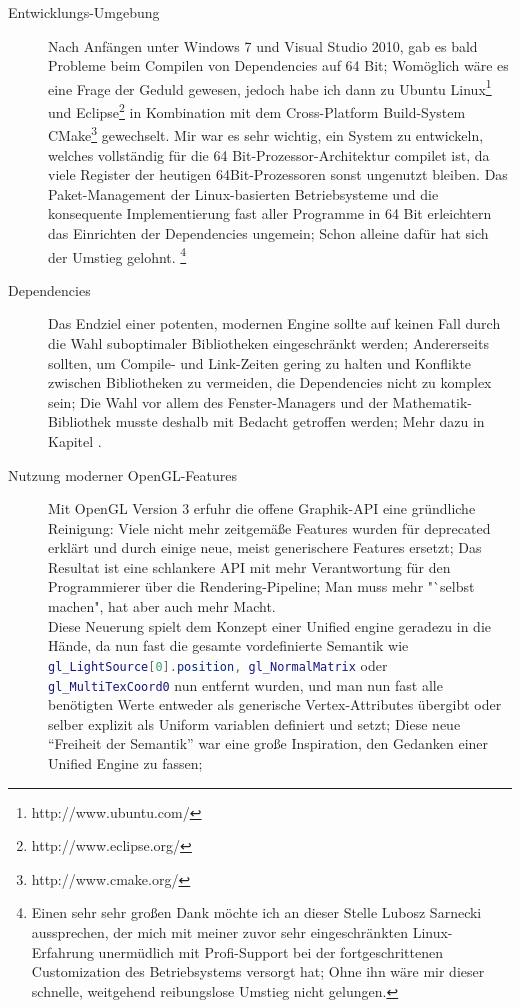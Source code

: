 \begin{description}

	\item[Entwicklungs-Umgebung]
	Nach Anfängen unter Windows 7 und Visual Studio 2010, gab es bald Probleme beim Compilen von Dependencies auf 
	64 Bit; Womöglich wäre es eine Frage der Geduld gewesen, jedoch habe ich dann zu 
	Ubuntu Linux\footnote{http://www.ubuntu.com/} und Eclipse\footnote{http://www.eclipse.org/} in 
	Kombination mit dem Cross-Platform Build-System CMake\footnote{http://www.cmake.org/} gewechselt. Mir war es sehr 	
	wichtig, ein System zu entwickeln, welches vollständig für die 64 Bit-Prozessor-Architektur compilet ist, da viele 
	Register der heutigen 64Bit-Prozessoren sonst ungenutzt bleiben.
	Das Paket-Management der Linux-basierten Betriebsysteme und die konsequente Implementierung fast aller Programme in 64 
	Bit erleichtern das Einrichten der Dependencies ungemein; Schon alleine dafür hat sich der Umstieg 
	gelohnt.
	\footnote{Einen sehr sehr großen Dank möchte ich an dieser Stelle Lubosz Sarnecki aussprechen, der mich mit 
	meiner zuvor sehr eingeschränkten Linux-Erfahrung unermüdlich mit Profi-Support bei der fortgeschrittenen Customization 
	des Betriebsystems versorgt hat; Ohne ihn wäre mir dieser schnelle, weitgehend reibungslose Umstieg nicht gelungen.}

	\item[Dependencies]
	Das Endziel einer potenten, modernen Engine sollte auf keinen Fall durch die Wahl suboptimaler Bibliotheken 
	eingeschränkt werden; Andererseits sollten, um Compile- und Link-Zeiten gering zu halten und Konflikte zwischen 
	Bibliotheken zu vermeiden, die Dependencies nicht zu komplex sein; Die Wahl vor allem des Fenster-Managers und der
	Mathematik-Bibliothek musste deshalb mit Bedacht getroffen werden; Mehr dazu in Kapitel \label{sec:dependencies}.
	
	
	
	\item[Nutzung moderner OpenGL-Features]
	Mit OpenGL Version 3 erfuhr die offene Graphik-API eine gründliche Reinigung: Viele nicht mehr zeitgemäße Features 
	wurden für deprecated erklärt und durch einige neue, meist generischere Features ersetzt;
	Das Resultat ist eine schlankere API mit mehr Verantwortung für den Programmierer über die Rendering-Pipeline;
	Man muss mehr "`selbst machen", hat aber auch mehr Macht.\\
	Diese Neuerung spielt dem Konzept einer Unified engine geradezu in die Hände, da nun fast die gesamte vordefinierte 
	Semantik wie 
	\lstinline[language=GLSL]|gl_LightSource[0].position, gl_NormalMatrix| oder 
	\lstinline[language=GLSL]|gl_MultiTexCoord0|
 	nun entfernt wurden, und man nun fast alle benötigten Werte entweder als generische Vertex-Attributes übergibt oder 
 	selber explizit als Uniform variablen definiert und setzt; Diese neue "`Freiheit der Semantik"' war eine große 
 	Inspiration, den Gedanken einer Unified Engine zu fassen;
	

\end{description}
